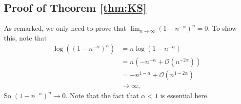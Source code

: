 \documentclass[runngingheads]{llncs}
\newcommand\recht\operatorname
\begin{document}
\subsection{Proof of Theorem \ref{thm:KS}}

As remarked, we only need to prove that $\lim_{n \rightarrow \infty} (1-n^{-\alpha})^n = 0$. To show this, note that
\begin{align*}
\log((1-n^{-\alpha})^n) &= n \log(1-n^{-\alpha}) \\
&= n(-n^{-\alpha}+\mathcal{O}(n^{-2\alpha})) \\
&= -n^{1-\alpha}+\mathcal{O}(n^{1-2\alpha}) \\
&\rightarrow \infty,
\end{align*}
So $(1-n^{-\alpha})^n \rightarrow 0$. Note that the fact that $\alpha < 1$ is essential here.



\end{document}
